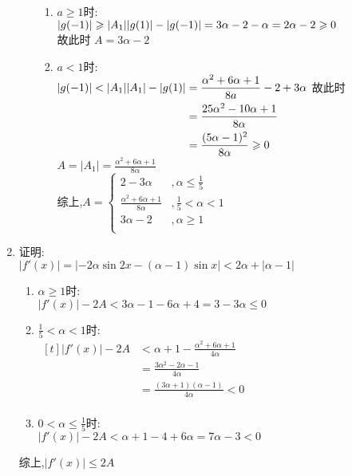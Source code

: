 \documentclass[class=ctexart,crop=false]{standalone}
\begin{document}
\begin{enumerate}[label=(\Roman*)]
\begin{enumerate}[label=(\roman*)]
            \begin{enumerate}[label=(\arabic*)]
                \item $a\geqslant 1$时:\\
                $|g(-1)|\geqslant|A_1|\\
                |g(1)|-|g(-1)|=3\alpha-2-\alpha=2\alpha-2\geqslant0$\\
                故此时 $A=3\alpha-2$                
                \item $a < 1$时:\\
                    $|g(-1)|<|A_1|\\
                    \begin{aligned}[t]
                        |A_1|-|g(1)|&=\frac{\alpha^2+6\alpha+1}{8a}-2+3\alpha\\
                            &=\frac{25\alpha^2-10\alpha+1}{8\alpha}\\
                            &=\frac{(5\alpha-1)^2}{8\alpha}\geqslant 0\\
                    \end{aligned}\\$
                故此时 $A=|A_1|=\frac{\alpha^2+6\alpha+1}{8\alpha}$\\
                综上,$A=
                    \begin{cases}
                        2-3\alpha &, \alpha \leqslant \frac{1}{5}\\
                        \frac{\alpha^2+6\alpha+1}{8\alpha} &,\frac{1}{5}<\alpha<1\\
                        3\alpha-2 &,\alpha \geqslant 1\\
                    \end{cases}$
            \end{enumerate}
        \end{enumerate}
    \item  证明:\\
        $|f'(x)|=|-2\alpha \sin 2x -(\alpha -1)\sin x|<2\alpha+|\alpha-1|$
        \begin{enumerate}
            \item $\alpha \geqslant 1$时:\\
                $|f'(x)|-2A<3\alpha-1-6\alpha+4=3-3\alpha\leqslant 0$
            \item $\frac{1}{5}< \alpha<1$时:\\
            $\begin{aligned}[t]
                |f'(x)|-2A&<\alpha+1-\frac{\alpha^2+6\alpha+1}{4\alpha}\\
                &=\frac{3\alpha^2-2\alpha-1}{4\alpha}\\
                &=\frac{(3\alpha+1)(\alpha-1)}{4\alpha}<0\\
            \end{aligned}$\\
            \item $0<\alpha\leqslant \frac{1}{5}$时:\\
            $|f'(x)|-2A<\alpha+1-4+6\alpha=7\alpha-3<0$
        \end{enumerate}
        综上,$|f'(x)|\leqslant 2A$
\end{enumerate}
\end{document}
